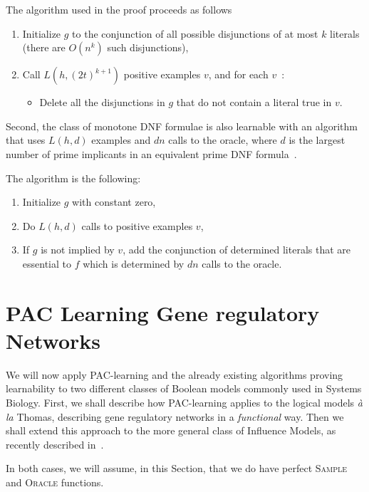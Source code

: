 \documentclass{llncs}
\begin{document}
The algorithm used in the proof proceeds as follows
\begin{enumerate}
  \item Initialize $g$ to the conjunction of all possible disjunctions of at most $k$ literals (there are $O(n^k)$ such disjunctions),
\item Call $L(h,(2t)^{k+1})$ positive examples $v$, and for each $v$~:
\begin{itemize}
\item Delete all the disjunctions in $g$ that do not contain a literal true in $v$.	
\end{itemize}

\end{enumerate}


\begin{theorem}
    Second, the class of monotone DNF formulae is also learnable with an
    algorithm that uses $L(h,d)$ examples and $d n$ calls to the oracle,
    where $d$ is the largest number of prime implicants in an equivalent prime DNF formula~\cite{Valiant84cacm}.
\end{theorem}

The algorithm is the following:
\begin{enumerate}
\item Initialize $g$ with constant zero,
\item
Do $L(h,d)$ calls to positive examples $v$,
\item
If $g$ is not implied by $v$, add the conjunction of determined literals that
are essential to $f$ which is determined by $d n$ calls to the oracle.
\end{enumerate}

\section{PAC Learning Gene regulatory Networks}

We will now apply PAC-learning and the already existing algorithms proving
learnability to two different classes of Boolean models commonly used in
Systems Biology. First, we shall describe how PAC-learning applies to the
logical models \emph{\`a la} Thomas, describing gene regulatory networks in a
\emph{functional} way. Then we shall extend this approach to the more general
class of Influence Models, as recently described in~\cite{FMRS16cmsb}.

In both cases, we will assume, in this Section, that we do have perfect
\textsc{Sample} and \textsc{Oracle} functions.
\end{document}
